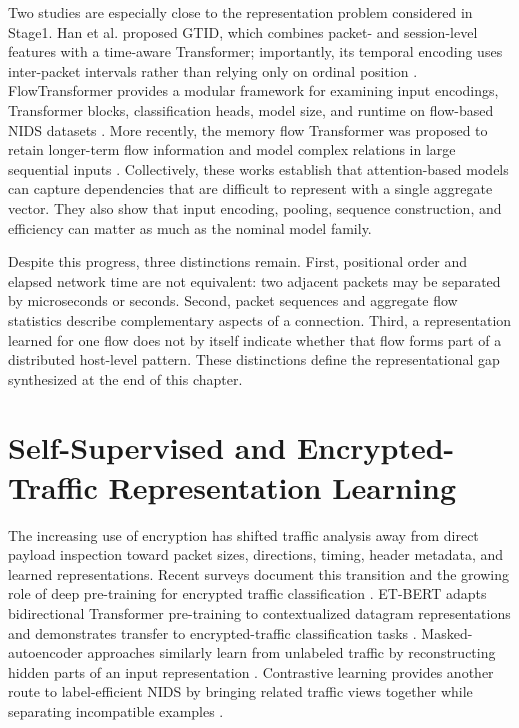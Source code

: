 \documentclass[11pt,fleqn]{report}
\begin{document}
Two studies are especially close to the representation problem considered in Stage1. Han et al. proposed GTID, which combines packet- and session-level features with a time-aware Transformer; importantly, its temporal encoding uses inter-packet intervals rather than relying only on ordinal position \cite{Han2023GTID}. FlowTransformer provides a modular framework for examining input encodings, Transformer blocks, classification heads, model size, and runtime on flow-based NIDS datasets \cite{Manocchio2024FlowTransformer}. More recently, the memory flow Transformer was proposed to retain longer-term flow information and model complex relations in large sequential inputs \cite{Jiang2025MFT}. Collectively, these works establish that attention-based models can capture dependencies that are difficult to represent with a single aggregate vector. They also show that input encoding, pooling, sequence construction, and efficiency can matter as much as the nominal model family.

Despite this progress, three distinctions remain. First, positional order and
elapsed network time are not equivalent: two adjacent packets may be separated
by microseconds or seconds. Second, packet sequences and aggregate flow
statistics describe complementary aspects of a connection. Third, a
representation learned for one flow does not by itself indicate whether that
flow forms part of a distributed host-level pattern. These distinctions define
the representational gap synthesized at the end of this chapter.

\section{Self-Supervised and Encrypted-Traffic Representation Learning}
\label{subsec:rw_ssl_encrypted}

The increasing use of encryption has shifted traffic analysis away from direct payload inspection toward packet sizes, directions, timing, header metadata, and learned representations. Recent surveys document this transition and the growing role of deep pre-training for encrypted traffic classification \cite{Sharma2025EncryptedSurvey,Dong2025EncryptedPretrain}. ET-BERT adapts bidirectional Transformer pre-training to contextualized datagram representations and demonstrates transfer to encrypted-traffic classification tasks \cite{Lin2022ETBERT}. Masked-autoencoder approaches similarly learn from unlabeled traffic by reconstructing hidden parts of an input representation \cite{Zhao2024MAETraffic,2024MAETraffic}. Contrastive learning provides another route to label-efficient NIDS by bringing related traffic views together while separating incompatible examples \cite{Li2024Contrastive}.
\end{document}
